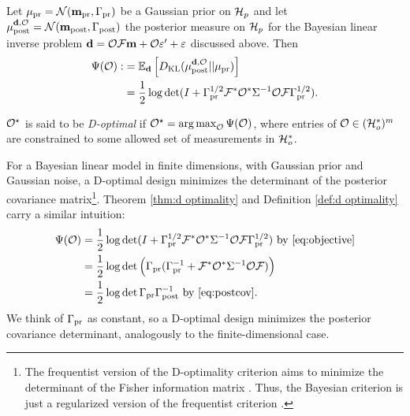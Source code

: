 \begin{theorem}\label{thm:d optimality}
  Let $\mu_{\textup{pr}} = \mathcal{N}(\mathbf{m}_{\textup{pr}},\Gamma_{\textup{pr}})$ be a Gaussian prior on $\mathcal{H}_p$
  and let $\mu_{\textup{post}}^{\mathbf{d}, \mathcal{O}} = \mathcal{N}(\mathbf{m}_{\textup{post}},\Gamma_{\textup{post}})$ the posterior measure
  on $\mathcal{H}_p$ for the Bayesian linear inverse problem $\mathbf{d} = \mathcal{O}
  \mathcal{F}\mathbf{m} + \mathcal{O} \varepsilon' + \varepsilon$ discussed above. Then
  \begin{align}\label{eq:objective}
    \begin{split}
      \tar( \obs) :&= \mathbb{E}_{\data}\left [ D_{\text{KL}} (\post || \pr ) \right ] \\
      &= \frac12 \log \det 
      ( I + \prcov^{1/2}  \fwd ^* \obs^* \Sigma^{-1} \obs \fwd \prcov^{1/2}).
    \end{split}
  \end{align}
\end{theorem}

\begin{definition}\label{def:d optimality}
  $\mathcal{O}^{\star}$ is said to be \emph{D-optimal} if $\mathcal{O}^{\star} =
  \operatorname*{arg\,max}_{\mathcal{O}} \Psi(\mathcal{O})$, where entries of $\mathcal{O} \in (\mathcal{H}_o^*)^m$
  are constrained to some allowed set of measurements in $\mathcal{H}_o^*$.
\end{definition}

For a Bayesian linear model in finite dimensions, with Gaussian prior
and Gaussian noise, a D-optimal design minimizes the determinant of
the posterior covariance matrix\footnote{The frequentist version of
the D-optimality criterion aims to minimize the determinant of the
Fisher information matrix \cite[page 16]{Ucinski05}. Thus, the
Bayesian criterion is just a regularized version of the frequentist
criterion \cite{Chaloner1995}.}. Theorem \ref{thm:d optimality} and
Definition \ref{def:d optimality} carry a similar intuition:
\begin{align*}
  \begin{split}
    \tar(\obs) &= \frac12 \log \det ( I + \prcov^{1/2}  \fwd ^* \obs^* \Sigma^{-1} \obs \fwd \prcov^{1/2}) \text{ by \eqref{eq:objective}}\\
    &= \frac12 \log \det \Big( \prcov ( \prcov^{-1} + \fwd ^* \obs^* \Sigma^{-1} \obs \fwd) \Big )\\
    &= \frac12 \log \det \prcov \postcov^{-1} \text{ by \eqref{eq:postcov}}.
  \end{split}
\end{align*}
We think of $\Gamma_{\textup{pr}}$ as constant, so a D-optimal design minimizes the
posterior covariance determinant, analogously to the
finite-dimensional case.


